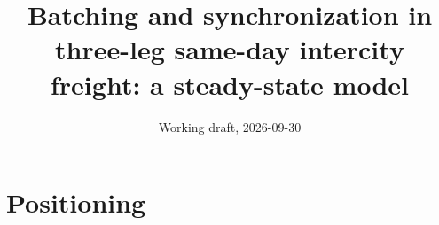 \documentclass[10pt, reqno]{amsart}
\theoremstyle{definition}
\begin{document}
\title{Batching and synchronization in three-leg same-day intercity freight: a steady-state model}
\author{Working draft, 2026-09-30}
\maketitle

%

\section{Positioning}
\end{document}
